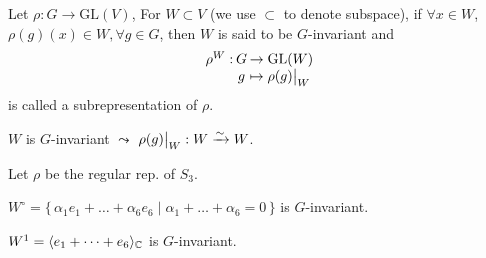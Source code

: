 \begin{definition}
  Let $\rho: G \to \text{GL}(V)$, For $W \subset V$ (we use $\subset$ to denote
  subspace), if $\forall x \in W$, $\rho(g)(x) \in W, \forall g \in G$, then
  $W$ is said to be $G$-invariant and
  \[
    \arraycolsep=1pt
    \begin{array}{rcl}
      \rho^W: & G & \to \text{GL}(W) \\
              & g & \mapsto \rho(g) \big|_W
    \end{array}
  \]
  is called a subrepresentation of $\rho$.
\end{definition}

$W$ is $G$-invariant $\leadsto$ $\rho(g) \big|_W: W \xrightarrow{\sim} W$.

\begin{example}
  Let $\rho$ be the regular rep. of $S_3$.

  $W^\circ = \{\, \alpha_1e_1 + \dots + \alpha_6e_6 \mid \alpha_1 +\dots + \alpha_6 = 0 \,\}$
  is $G$-invariant.

  $W^1 = \langle e_1 + \dots + e_6\rangle_{\mathbb{C}}$ is $G$-invariant.
\end{example}

